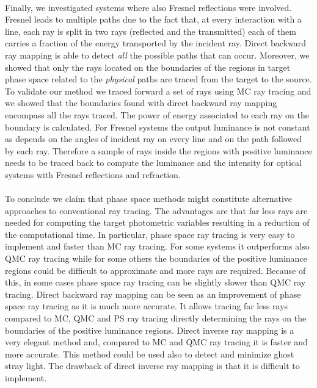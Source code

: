 \\ \indent
Finally, we investigated systems where also Fresnel reflections were involved. Fresnel leads to multiple paths due to the fact that, at every interaction with a line, each ray is split in two rays (reflected and the transmitted) each of them carries a fraction of the energy transported by the incident ray. Direct backward ray mapping is able to detect \textit{all} the possible paths that can occur. Moreover, we showed that only the rays located on the boundaries of the regions in target phase space related to the \textit{physical} paths are traced from the target to the source. To validate our method we traced forward a set of rays using MC ray tracing and we showed that the boundaries found with direct backward ray mapping encompass all the rays traced. The power of energy associated to each ray on the boundary is calculated. For Fresnel systems the output luminance is not constant as depends on the angles of incident ray on every line and on the path followed by each ray. Therefore a sample of rays inside the regions with positive luminance needs to be traced back to compute the luminance and the intensity for optical systems with Fresnel reflections and refraction.
\\ \\ \indent To conclude we claim that phase space methods might constitute alternative approaches to conventional ray tracing. The advantages are that far less rays are needed for computing the target photometric variables resulting in a reduction of the computational time. In particular, phase space ray tracing is very easy to implement and faster than MC ray tracing. For some systems it outperforms also QMC ray tracing while for some others the boundaries of the positive luminance regions could be difficult to approximate and more rays are required. Because of this, in some cases phase space ray tracing can be slightly slower than QMC ray tracing. Direct backward ray mapping can be seen as an improvement of phase space ray tracing as it is much more accurate. It allows tracing far less rays compared to MC, QMC and PS ray tracing directly determining the rays on the boundaries of the positive luminance regions. Direct inverse ray mapping is a very elegant method and, compared to MC and QMC ray tracing it is faster and more accurate. This method could be used also to detect and minimize ghost stray light. The drawback of direct inverse ray mapping is that it is difficult to implement.
